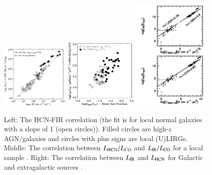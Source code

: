 \documentclass[legal,11pt]{article}
\begin{document}
\begin{figure}
\centering

\includegraphics[width=0.3\textwidth]{Gao07.eps}
\includegraphics[width=0.32\textwidth]{gs04.eps}
\includegraphics[width=0.35\textwidth]{wu05b.pdf}

\caption{Left: The HCN-FIR correlation (the fit is for local normal galaxies
        with a slope of 1 (open circles)).  Filled circles are high-$z$
        AGN/galaxies \citep{Gao2007} and circles with plus signs are local
        (U)LIRGs.  Middle: The correlation between $L_{\rm HCN}/L_{CO}$ and
        $L_{\rm IR}/L_{\rm CO}$ for a local sample \citep{gs04a}. Right: The
        correlation between $L_{\rm IR}$ and $L_{\rm HCN}$ for Galactic and
        extragalactic sources \citep{weg05}.}
\label{fig:hcn10}
\end{figure}
\end{document}

